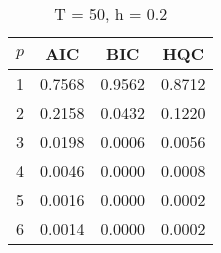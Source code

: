 \begin{table}[ht]
\captionsetup{justification=raggedright,singlelinecheck=false}
\caption*{T = 50, h = 0.2}
\begin{tabular}{c|ccc}
  $p$ & AIC & BIC & HQC \\\hline
  1 & 0.7568 & 0.9562 & 0.8712 \\
  2 & 0.2158 & 0.0432 & 0.1220 \\
  3 & 0.0198 & 0.0006 & 0.0056 \\
  4 & 0.0046 & 0.0000 & 0.0008 \\
  5 & 0.0016 & 0.0000 & 0.0002 \\
  6 & 0.0014 & 0.0000 & 0.0002 \\
\end{tabular}
\end{table}
